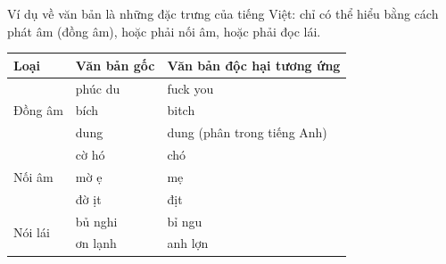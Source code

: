 Ví dụ về văn bản là những đặc trưng của tiếng Việt: chỉ có thể hiểu bằng cách phát âm (đồng âm), hoặc phải nối âm, hoặc phải đọc lái.
\begin{table}[htb]
\centering
\begin{tabular}{lll}
    \toprule
    \textbf{Loại}            & \textbf{Văn bản gốc} & \textbf{Văn bản độc hại tương ứng} \\\midrule
    \multirow{3}{*}{Đồng âm} & phúc du              & fuck you                           \\
                             & bích                 & bitch                              \\
                             & dung                 & dung (phân trong tiếng Anh)        \\\midrule
    \multirow{3}{*}{Nối âm}  & cờ hó                & chó                                \\
                             & mờ ẹ                 & mẹ                                 \\
                             & đờ ịt                & địt                                \\\midrule
    \multirow{2}{*}{Nói lái} & bủ nghi              & bỉ ngu                             \\
                             & ơn lạnh              & anh lợn                            \\
    \bottomrule
\end{tabular}
\end{table}

\newpage

